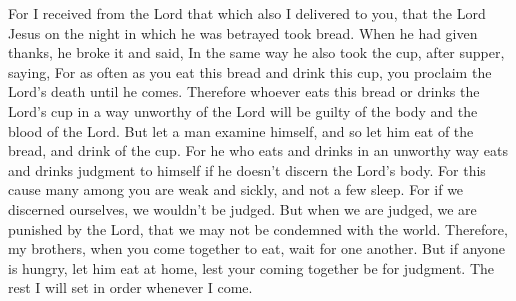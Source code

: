 {\par }{\PP {}For I received from the Lord that which also I delivered to you, that the Lord Jesus on the night in which he was betrayed took bread.
When he had given thanks, he broke it and said,
{}
In the same way he also took the cup, after supper, saying,
{}
For as often as you eat this bread and drink this cup, you proclaim the Lord’s death until he comes.
Therefore whoever eats this bread or drinks the Lord’s cup in a way unworthy of the Lord will be guilty of the body and the blood of the Lord.
But let a man examine himself, and so let him eat of the bread, and drink of the cup.
For he who eats and drinks in an unworthy way eats and drinks judgment to himself if he doesn’t discern the Lord’s body.
For this cause many among you are weak and sickly, and not a few sleep.
For if we discerned ourselves, we wouldn’t be judged.
But when we are judged, we are punished by the Lord, that we may not be condemned with the world.
Therefore, my brothers, when you come together to eat, wait for one another.
But if anyone is hungry, let him eat at home, lest your coming together be for judgment. The rest I will set in order whenever I come.

}
